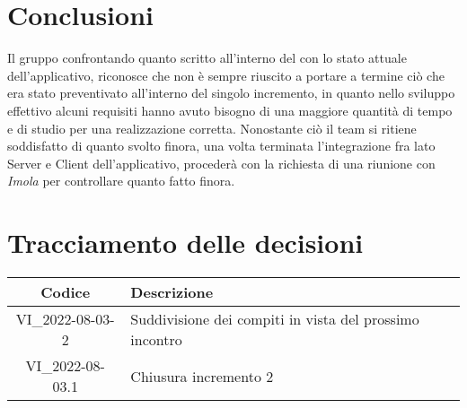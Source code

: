 \section{Conclusioni}
Il gruppo confrontando quanto scritto all'interno del  con lo stato attuale dell'applicativo, riconosce che non è sempre riuscito a portare a termine ciò che era stato preventivato all'interno del singolo incremento, in quanto nello sviluppo effettivo alcuni requisiti hanno avuto bisogno di una maggiore quantità di tempo e di studio per una realizzazione corretta. \newline
Nonostante ciò il team si ritiene soddisfatto di quanto svolto finora, una volta terminata l'integrazione fra lato Server e Client dell'applicativo, procederà con la richiesta di una riunione con \textit{Imola} per controllare quanto fatto finora. 
\newpage

\section*{Tracciamento delle decisioni}
	\renewcommand{\arraystretch}{1.8} %
	\begin{tabular}{ |c|l| }
		\hline
		\textbf{Codice} & \textbf{Descrizione} \\
		\hline
		VI\_2022-08-03-2 & Suddivisione dei compiti in vista del prossimo incontro \\
		\hline
		VI\_2022-08-03.1 & Chiusura incremento 2 \\
		\hline
	\end{tabular}